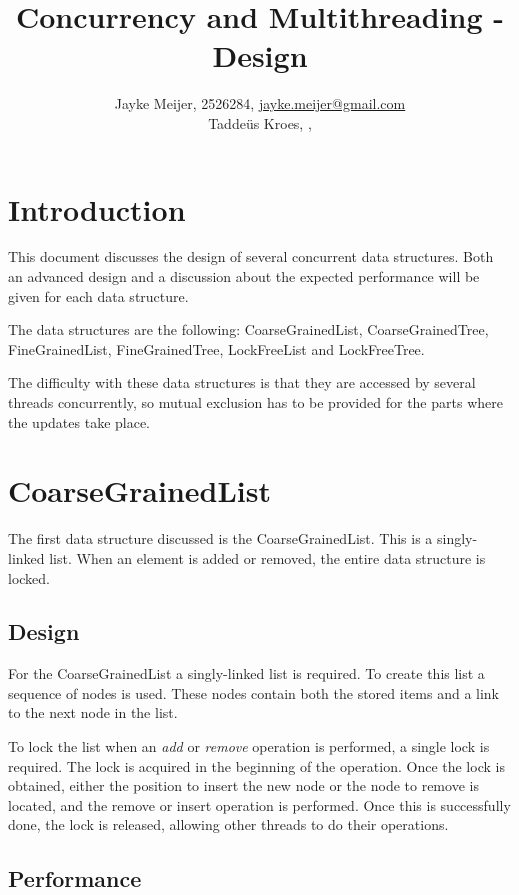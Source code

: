 \documentclass[a4paper]{article}
\title{Concurrency and Multithreading - Design}
\author{Jayke Meijer, 2526284, \url{jayke.meijer@gmail.com} \\
Tadde\"us Kroes, , \url{}}
\begin{document}
\maketitle
\pagebreak

\tableofcontents
\pagebreak

\section{Introduction}

This document discusses the design of several concurrent data
structures. Both an advanced design and a discussion about the
expected performance will be given for each data structure.

The data structures are the following: CoarseGrainedList,
CoarseGrainedTree, FineGrainedList, FineGrainedTree,
LockFreeList and LockFreeTree.

The difficulty with these data structures is that they are
accessed by several threads concurrently, so mutual exclusion has
to be provided for the parts where the updates take place.

\section{CoarseGrainedList}

The first data structure discussed is the CoarseGrainedList.
This is a singly-linked list. When an element is added or removed,
the entire data structure is locked.

\subsection{Design}

For the CoarseGrainedList a singly-linked list is required. To create this
list a sequence of nodes is used. These nodes contain both the stored items
and a link to the next node in the list.

To lock the list when an \emph{add} or \emph{remove} operation is performed,
a single lock is required. The lock is acquired in the beginning of the
operation. Once the lock is obtained, either the position to insert the new
node or the node to remove is located, and the remove or insert operation is
performed. Once this is successfully done, the lock is released, allowing
other threads to do their operations.

\subsection{Performance}
\end{document}
